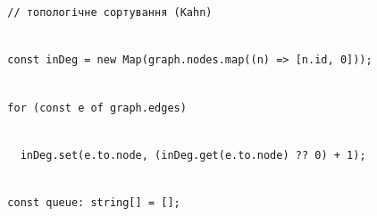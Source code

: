 \documentclass[
]{article}
\newcommand{\passthrough}[1]{#1}
\begin{document}
\passthrough{\lstinline!  !}\passthrough{\lstinline!//!}\passthrough{\lstinline! !}\passthrough{\lstinline!топологічне!}\passthrough{\lstinline! !}\passthrough{\lstinline!сортування!}\passthrough{\lstinline! !}\passthrough{\lstinline!(!}\passthrough{\lstinline!Kahn!}\passthrough{\lstinline!)!}\strut \\
\passthrough{\lstinline!  !}\passthrough{\lstinline!const!}\passthrough{\lstinline! !}\passthrough{\lstinline!inDeg!}\passthrough{\lstinline! !}\passthrough{\lstinline!=!}\passthrough{\lstinline! !}\passthrough{\lstinline!new!}\passthrough{\lstinline! !}\passthrough{\lstinline!Map!}\passthrough{\lstinline!(!}\passthrough{\lstinline!graph!}\passthrough{\lstinline!.!}\passthrough{\lstinline!nodes!}\passthrough{\lstinline!.!}\passthrough{\lstinline!map!}\passthrough{\lstinline!((!}\passthrough{\lstinline!n!}\passthrough{\lstinline!)!}\passthrough{\lstinline! !}\passthrough{\lstinline!=>!}\passthrough{\lstinline! !}\passthrough{\lstinline![!}\passthrough{\lstinline!n!}\passthrough{\lstinline!.!}\passthrough{\lstinline!id!}\passthrough{\lstinline!,!}\passthrough{\lstinline! !}\passthrough{\lstinline!0]));!}\strut \\
\passthrough{\lstinline!  !}\passthrough{\lstinline!for!}\passthrough{\lstinline! !}\passthrough{\lstinline!(!}\passthrough{\lstinline!const!}\passthrough{\lstinline! !}\passthrough{\lstinline!e!}\passthrough{\lstinline! !}\passthrough{\lstinline!of!}\passthrough{\lstinline! !}\passthrough{\lstinline!graph!}\passthrough{\lstinline!.!}\passthrough{\lstinline!edges!}\passthrough{\lstinline!)!}\strut \\
\passthrough{\lstinline!    !}\passthrough{\lstinline!inDeg!}\passthrough{\lstinline!.!}\passthrough{\lstinline!set!}\passthrough{\lstinline!(!}\passthrough{\lstinline!e!}\passthrough{\lstinline!.!}\passthrough{\lstinline!to!}\passthrough{\lstinline!.!}\passthrough{\lstinline!node!}\passthrough{\lstinline!,!}\passthrough{\lstinline! !}\passthrough{\lstinline!(!}\passthrough{\lstinline!inDeg!}\passthrough{\lstinline!.!}\passthrough{\lstinline!get!}\passthrough{\lstinline!(!}\passthrough{\lstinline!e!}\passthrough{\lstinline!.!}\passthrough{\lstinline!to!}\passthrough{\lstinline!.!}\passthrough{\lstinline!node!}\passthrough{\lstinline!)!}\passthrough{\lstinline! !}\passthrough{\lstinline!??!}\passthrough{\lstinline! !}\passthrough{\lstinline!0)!}\passthrough{\lstinline! !}\passthrough{\lstinline!+!}\passthrough{\lstinline! !}\passthrough{\lstinline!1);!}\strut \\
\passthrough{\lstinline!  !}\passthrough{\lstinline!const!}\passthrough{\lstinline! !}\passthrough{\lstinline!queue:!}\passthrough{\lstinline! !}\passthrough{\lstinline!string[]!}\passthrough{\lstinline! !}\passthrough{\lstinline!=!}\passthrough{\lstinline! !}\passthrough{\lstinline![];!}\strut \\
\end{document}
